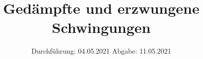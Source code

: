 

\subject{V354}
\title{Gedämpfte und erzwungene Schwingungen}
\date{%
  Durchführung: 04.05.2021
  \hspace{3em}
  Abgabe: 11.05.2021
}



\maketitle
\thispagestyle{empty}
\tableofcontents
\newpage





\nocite{*}
\printbibliography{}



